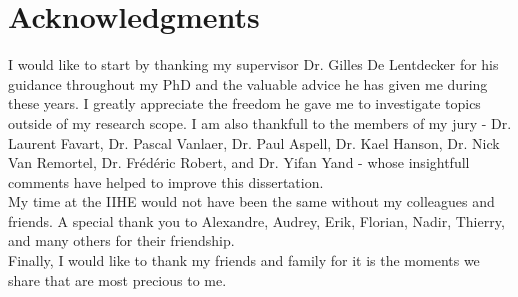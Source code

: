 \chapter*{Acknowledgments}

  I would like to start by thanking my supervisor Dr. Gilles De Lentdecker for his guidance throughout my PhD and the valuable advice he has given me during these years. I greatly appreciate the freedom he gave me to investigate topics outside of my research scope. I am also thankfull to the members of my jury - Dr. Laurent Favart, Dr. Pascal Vanlaer, Dr. Paul Aspell, Dr. Kael Hanson, Dr. Nick Van Remortel, Dr. Frédéric Robert, and Dr. Yifan Yand -  whose insightfull comments have helped to improve this dissertation. \\

  My time at the IIHE would not have been the same without my colleagues and friends. A special thank you to Alexandre, Audrey, Erik, Florian, Nadir, Thierry, and many others for their friendship. \\

  Finally, I would like to thank my friends and family for it is the moments we share that are most precious to me.
